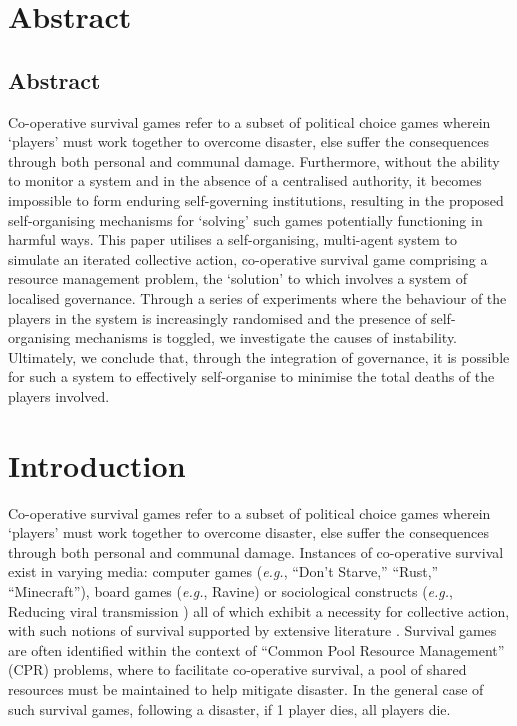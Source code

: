\chapter{Abstract}\label{abstract}

\section{Abstract}

Co-operative survival games refer to a subset of political choice games wherein `players' must work together to overcome disaster, else suffer the consequences through both personal and communal damage. Furthermore, without the ability to monitor a system and in the absence of a centralised authority, it becomes impossible to form enduring self-governing institutions, resulting in the proposed self-organising mechanisms for `solving' such games potentially functioning in harmful ways. This paper utilises a self-organising, multi-agent system to simulate an iterated collective action, co-operative survival game comprising a resource management problem, the `solution' to which involves a system of localised governance. Through a series of experiments where the behaviour of the players in the system is increasingly randomised and the presence of self-organising mechanisms is toggled, we investigate the causes of instability. Ultimately, we conclude that, through the integration of governance, it is possible for such a system to effectively self-organise to minimise the total deaths of the players involved.

\chapter{Introduction}\label{introduction}

Co-operative survival games refer to a subset of political choice games wherein `players' must work together to overcome disaster, else suffer the consequences through both personal and communal damage. Instances of co-operative survival exist in varying media: computer games (\emph{e.g.}, ``Don't Starve,'' ``Rust,'' ``Minecraft''), board games (\emph{e.g.}, Ravine) or sociological constructs (\emph{e.g.}, Reducing viral transmission ) all of which exhibit a necessity for collective action, with such notions of survival supported by extensive literature \cite{su10030652}. Survival games are often identified within the context of ``Common Pool Resource Management'' (CPR) \cite{ostromCollectiveAction} \cite{smartHome} problems, where to facilitate co-operative survival, a pool of shared resources must be maintained to help mitigate disaster. In the general case of such survival games, following a disaster, if 1 player dies, all players die.

